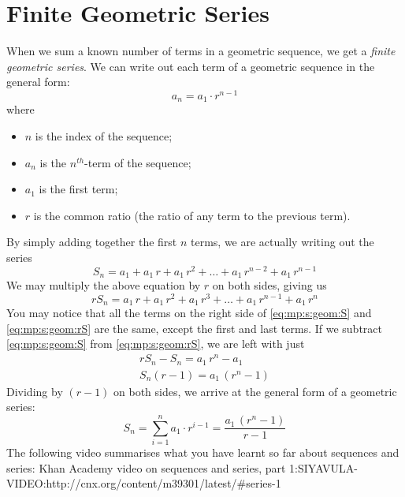 \section{Finite Geometric Series}
When we sum a known number of terms in a geometric sequence, we get a \textit{finite geometric series}. %
We can write out each term of a geometric sequence in the general form:
\begin{equation}
a_n = a_1 \cdot r^{n-1}
\end{equation}
where
\begin{itemize}
\item $n$ is the index of the sequence;
\item $a_n$ is the $n^{th}$-term of the sequence;
\item $a_1$ is the first term;
\item $r$ is the common ratio (the ratio of any term to the previous term).
\end{itemize}

\vspace{12pt}
By simply adding together the first $n$ terms, we are actually writing out the series
\begin{equation}
\label{eq:mp:s:geom:S}
S_n = a_1 + a_1\,r + a_1\,r^2 + \ldots + a_1\,r^{n-2} + a_1\,r^{n-1}
\end{equation}
We may multiply the above equation by $r$ on both sides, giving us
\begin{equation}
\label{eq:mp:s:geom:rS}
rS_n = a_1\,r + a_1\,r^2 + a_1\,r^3 + \ldots + a_1\,r^{n-1} + a_1\,r^n
\end{equation}
You may notice that all the terms on the right side of \eqref{eq:mp:s:geom:S} and \eqref{eq:mp:s:geom:rS} are the same, except the first and last terms. If we subtract \eqref{eq:mp:s:geom:S} from \eqref{eq:mp:s:geom:rS}, we are left with just
\begin{eqnarray*}
\label{eq:mp:s:geom:proof}
rS_n - S_n = a_1\,r^n - a_1 \\
S_n(r - 1) = a_1\,(r^n - 1)
\end{eqnarray*}
Dividing by $(r-1)$ on both sides, we arrive at the general form of a geometric series:
\begin{equation}
\label{eq:mp:se:fg:4}
\boxed{S_n = \sum_{i=1}^n a_1 \cdot r^{i-1} = \frac{a_1 \, (r^n - 1)}{r-1}}
\end{equation}
The following video summarises what you have learnt so far about sequences and series:
Khan Academy video on sequences and series, part 1:SIYAVULA-VIDEO:http://cnx.org/content/m39301/latest/#series-1
